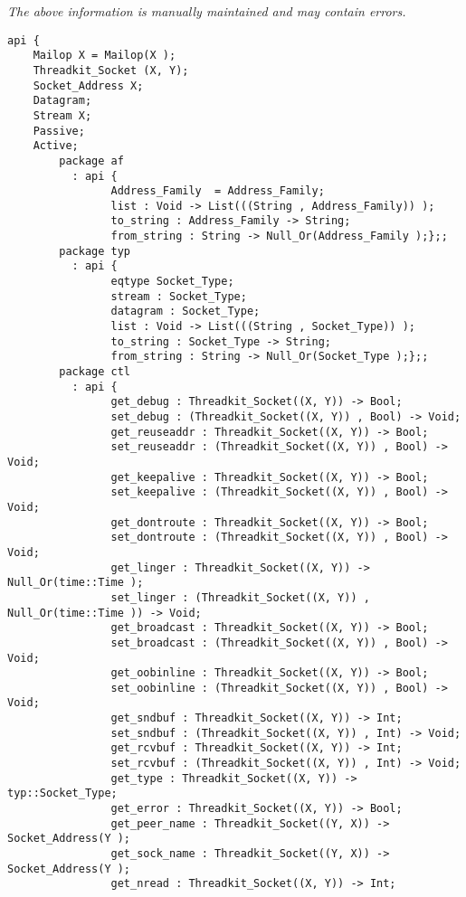 \label{api:Socket}

{\tiny \it The above information is manually maintained and may contain errors.}
\begin{verbatim}
api {
    Mailop X = Mailop(X );
    Threadkit_Socket (X, Y);
    Socket_Address X;
    Datagram;
    Stream X;
    Passive;
    Active;
        package af
          : api {
                Address_Family  = Address_Family;
                list : Void -> List(((String , Address_Family)) );
                to_string : Address_Family -> String;
                from_string : String -> Null_Or(Address_Family );};;
        package typ
          : api {
                eqtype Socket_Type;
                stream : Socket_Type;
                datagram : Socket_Type;
                list : Void -> List(((String , Socket_Type)) );
                to_string : Socket_Type -> String;
                from_string : String -> Null_Or(Socket_Type );};;
        package ctl
          : api {
                get_debug : Threadkit_Socket((X, Y)) -> Bool;
                set_debug : (Threadkit_Socket((X, Y)) , Bool) -> Void;
                get_reuseaddr : Threadkit_Socket((X, Y)) -> Bool;
                set_reuseaddr : (Threadkit_Socket((X, Y)) , Bool) -> Void;
                get_keepalive : Threadkit_Socket((X, Y)) -> Bool;
                set_keepalive : (Threadkit_Socket((X, Y)) , Bool) -> Void;
                get_dontroute : Threadkit_Socket((X, Y)) -> Bool;
                set_dontroute : (Threadkit_Socket((X, Y)) , Bool) -> Void;
                get_linger : Threadkit_Socket((X, Y)) -> Null_Or(time::Time );
                set_linger : (Threadkit_Socket((X, Y)) , Null_Or(time::Time )) -> Void;
                get_broadcast : Threadkit_Socket((X, Y)) -> Bool;
                set_broadcast : (Threadkit_Socket((X, Y)) , Bool) -> Void;
                get_oobinline : Threadkit_Socket((X, Y)) -> Bool;
                set_oobinline : (Threadkit_Socket((X, Y)) , Bool) -> Void;
                get_sndbuf : Threadkit_Socket((X, Y)) -> Int;
                set_sndbuf : (Threadkit_Socket((X, Y)) , Int) -> Void;
                get_rcvbuf : Threadkit_Socket((X, Y)) -> Int;
                set_rcvbuf : (Threadkit_Socket((X, Y)) , Int) -> Void;
                get_type : Threadkit_Socket((X, Y)) -> typ::Socket_Type;
                get_error : Threadkit_Socket((X, Y)) -> Bool;
                get_peer_name : Threadkit_Socket((Y, X)) -> Socket_Address(Y );
                get_sock_name : Threadkit_Socket((Y, X)) -> Socket_Address(Y );
                get_nread : Threadkit_Socket((X, Y)) -> Int;

\end{verbatim}

